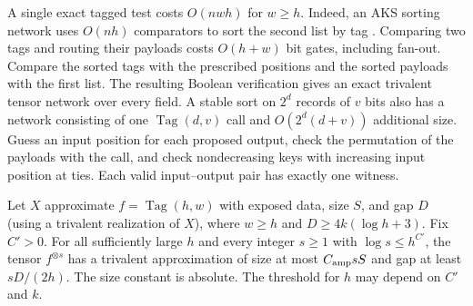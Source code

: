 A single exact tagged test costs $O(nwh)$ for $w\ge h$. Indeed, an AKS
sorting network uses $O(nh)$ comparators to sort the second list by tag
\cite{AKS}. Comparing two tags and routing their payloads costs
$O(h+w)$ bit gates, including fan-out. Compare the sorted tags with the
prescribed positions and the sorted payloads with the first list.
The resulting Boolean verification gives an exact trivalent tensor
network over every field. A stable sort on $2^d$ records of $v$ bits
also has a network consisting of one $\operatorname{Tag}(d,v)$ call and
$O(2^d(d+v))$ additional size. Guess an input position for each proposed
output, check the permutation of the payloads with the call, and check
nondecreasing keys with increasing input position at ties. Each valid
input--output pair has exactly one witness.

\begin{lemma}[Amplification]\label{lem:tag-amplification}
Let $X$ approximate $f=\operatorname{Tag}(h,w)$ with exposed data, size
$S$, and gap $D$ (using a trivalent realization of $X$), where $w\ge h$ and $D\ge4k(\log h+3)$. Fix $C'>0$.
For all sufficiently large $h$ and every integer $s\ge1$ with
$\log s\le h^{C'}$, the tensor $f^{\otimes s}$ has a trivalent
approximation of size at most $C_{\rm amp}sS$ and gap at least
$sD/(2h)$. The size constant is absolute. The threshold for $h$ may
depend on $C'$ and $k$.
\end{lemma}

